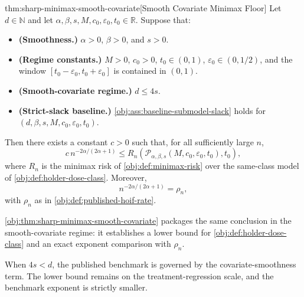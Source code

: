 \documentclass[11pt]{article}
\begin{document}
\begin{theoremv}{thm:sharp-minimax-smooth-covariate}[Smooth Covariate Minimax Floor]
Let \(d\in\mathbb N\) and let \(\alpha,\beta,s,M,c_0,\varepsilon_0,t_0\in\mathbb R\). Suppose that:
\begin{itemize}
\item \textbf{(Smoothness.)} \(\alpha>0\), \(\beta>0\), and \(s>0\).
\item \textbf{(Regime constants.)} \(M>0\), \(c_0>0\), \(t_0\in(0,1)\), \(\varepsilon_0\in(0,1/2)\), and the window \([t_0-\varepsilon_0,t_0+\varepsilon_0]\) is contained in \((0,1)\).
\item \textbf{(Smooth-covariate regime.)} \(d\le 4s\).
\item \textbf{(Strict-slack baseline.)} \cref{obj:ass:baseline-submodel-slack} holds for \((d,\beta,s,M,c_0,\varepsilon_0,t_0)\).
\end{itemize}
Then there exists a constant \(c>0\) such that, for all sufficiently large \(n\),
\[
c\,n^{-2\alpha/(2\alpha+1)}
\le
R_n\!\left(
\mathcal P_{\alpha,\beta,s}(M,c_0,\varepsilon_0,t_0),t_0
\right),
\]
where \(R_n\) is the minimax risk of \cref{obj:def:minimax-risk} over the same-class model of \cref{obj:def:holder-dose-class}. Moreover,
\[
n^{-2\alpha/(2\alpha+1)}
=
\rho_n,
\]
with \(\rho_n\) as in \cref{obj:def:published-hoif-rate}.
\end{theoremv}

\cref{obj:thm:sharp-minimax-smooth-covariate} packages the same conclusion in the smooth-covariate regime: it establishes a lower bound for \cref{obj:def:holder-dose-class} and an exact exponent comparison with \(\rho_n\).

When \(4s<d\), the published benchmark is governed by the covariate-smoothness term. The lower bound remains on the treatment-regression scale, and the benchmark exponent is strictly smaller.
\end{document}
